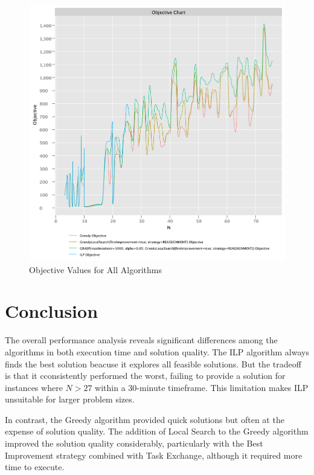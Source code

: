 \documentclass{article}
\begin{document}
\begin{figure}[!h]
    \centering
    \includegraphics[width=1\textwidth]{./documentation/assets/new.all.objectiveChart.pdf}
    \caption{Objective Values for All Algorithms}
    \label{fig:all_objective}
\end{figure}\FloatBarrier

\newpage

\section{Conclusion}

The overall performance analysis reveals significant differences among the algorithms in both execution time and solution quality. The ILP algorithm always finds the best solution beacuse it explores all feasible solutions. But the tradeoff is that it cconsistently performed the worst, failing to provide a solution for instances where \( N > 27 \) within a 30-minute timeframe. This limitation makes ILP unsuitable for larger problem sizes.

In contrast, the Greedy algorithm provided quick solutions but often at the expense of solution quality. The addition of Local Search to the Greedy algorithm improved the solution quality considerably, particularly with the Best Improvement strategy combined with Task Exchange, although it required more time to execute.
\end{document}
